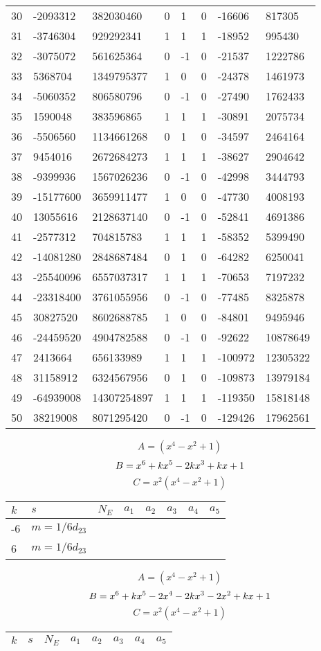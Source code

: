\documentclass{amsart}
\begin{document}
\begin{longtable}{|l|l|l|lllll|}
30&-2093312&382030460&0&1&0&-16606&817305\\
31&-3746304&929292341&1&1&1&-18952&995430\\
32&-3075072&561625364&0&-1&0&-21537&1222786\\
33&5368704&1349795377&1&0&0&-24378&1461973\\
34&-5060352&806580796&0&-1&0&-27490&1762433\\
35&1590048&383596865&1&1&1&-30891&2075734\\
36&-5506560&1134661268&0&1&0&-34597&2464164\\
37&9454016&2672684273&1&1&1&-38627&2904642\\
38&-9399936&1567026236&0&-1&0&-42998&3444793\\
39&-15177600&3659911477&1&0&0&-47730&4008193\\
40&13055616&2128637140&0&-1&0&-52841&4691386\\
41&-2577312&704815783&1&1&1&-58352&5399490\\
42&-14081280&2848687484&0&1&0&-64282&6250041\\
43&-25540096&6557037317&1&1&1&-70653&7197232\\
44&-23318400&3761055956&0&-1&0&-77485&8325878\\
45&30827520&8602688785&1&0&0&-84801&9495946\\
46&-24459520&4904782588&0&-1&0&-92622&10878649\\
47&2413664&656133989&1&1&1&-100972&12305322\\
48&31158912&6324567956&0&1&0&-109873&13979184\\
49&-64939008&14307254897&1&1&1&-119350&15818148\\
50&38219008&8071295420&0&-1&0&-129426&17962561\\
\hline
\end{longtable}
$$A=(x^4
 - x^2
 + 1)$$
$$B=x^6
 + k\*x^5
 - 2\*k\*x^3
 + k\*x
 + 1$$
$$C=x^2(x^4
 - x^2
 + 1)$$
\begin{longtable}{|l|l|l|lllll|}
\hline
$k$ & $s$ & $N_E$ & $a_1$ & $a_2$ & $a_3$ & $a_4$ & $a_5$\\
\hline
-6&$m=1/6d_{23}$&&\multicolumn{5}{c|}{}\\
6&$m=1/6d_{23}$&&\multicolumn{5}{c|}{}\\
\hline
\end{longtable}
$$A=(x^4
 - x^2
 + 1)$$
$$B=x^6
 + k\*x^5
 - 2\*x^4
 - 2\*k\*x^3
 - 2\*x^2
 + k\*x
 + 1$$
$$C=x^2(x^4
 - x^2
 + 1)$$
\begin{longtable}{|l|l|l|lllll|}
\hline
$k$ & $s$ & $N_E$ & $a_1$ & $a_2$ & $a_3$ & $a_4$ & $a_5$\\
\hline
\hline
\end{longtable}
\end{document}
